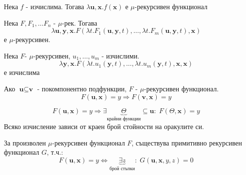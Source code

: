 \begin{corollary}
    Нека $f$ - изчислима. Тогава $\lambda \textbf{u}, \textbf{x}. f(\textbf{x})$ е $\mu$-рекурсивен функционал
\end{corollary}
\begin{corollary}
    Нека $F, F_1, \dots F_n$ - $\mu$-рек. Тогава 
    \begin{equation*}
        \lambda \textbf{u}, \textbf{y}, \textbf{x}. F(\lambda t. F_1(\textbf{u}, \textbf{y}, t), \dots, \lambda t. F_m(\textbf{u}, \textbf{y}, t), \textbf{x})
    \end{equation*}
    е $\mu$-рекурсивен.
\end{corollary}
\begin{corollary}
    Нека $F$- $\mu$-рекурсивен, $u_1, \dots, u_m$ - изчислими.
    \begin{equation*}
        \lambda \textbf{y}, \textbf{x}. F(\lambda t. u_1(\textbf{y}, t), \dots, \lambda t. u_m(\textbf{y}, t), \textbf{x}, \textbf{x})
    \end{equation*}
    е изчислима
\end{corollary}
\begin{corollary}[Монотонност]
    Ако $\textbf{u} \subseteq \textbf{v}$ - покомпонентно подфункции, $F$ - $\mu$-рекурсивен функционал.
    \begin{equation*}
        F(\textbf{u}, \textbf{x}) = y \Rightarrow F(\textbf{v}, \textbf{x}) = y
    \end{equation*}
\end{corollary}
\begin{corollary}[Компактност]
    \begin{equation}
        F(\textbf{u}, \textbf{x}) = y \Rightarrow \exists \underbrace{\Theta}_{\text{крайни функции}} \subseteq \textbf{u}:\; F(\Theta, \textbf{x}) = y
    \end{equation}
    Всяко изчисление зависи от краен брой стойности на оракулите си.
\end{corollary}
\begin{proposition}
    За произволен $\mu$-рекурсивен функционал $F$, съществува примитивно рекурсивен функционал $G$, т.ч.:
    \begin{equation}
        F(\textbf{u}, \textbf{x}) = y \iff \underbrace{\exists z}_{\text{брой стъпки}}:\; G(\textbf{u}, \textbf{x}, y, z) = 0
    \end{equation}
\end{proposition}

